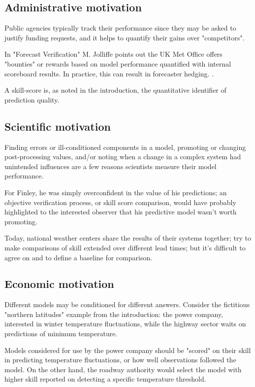 \documentclass[logos,parttoc,morelanguage=french,morelanguage=german,draft]{orsay-memoire}
\begin{document}
\subsection{Administrative motivation}
Public agencies typically track their performance since they may be asked to justify funding requests, and it helps to quantify their gains over "competitors".

In "Forecast Verification" M. Jolliffe points out the UK Met Office offers "bounties" or rewards based on model performance quantified with internal scoreboard results. In practice, this can result in forecaster hedging.
\autocite{JolliffeIanT.andStephenson2012ForecastVerification}. 

A \gls{skill-score} is, as noted in the introduction, the quantitative identifier of prediction quality.

\subsection{Scientific motivation}

Finding errors or ill-conditioned components in a model, promoting or changing post-processing values, and/or noting when a change in a complex system had unintended influences are a few reasons scientists measure their model performance.

For Finley, he was simply overconfident in the value of his predictions; an objective verification process, or skill score comparison, would have probably highlighted to the interested observer that his predictive model wasn't worth promoting. 

Today, national weather centers share the results of their systems together; try to make comparisons of skill extended over different lead times; but it's difficult to agree on and to define a baseline for comparison.

\subsection{Economic motivation}

Different models may be conditioned for different answers. Consider the fictitious "northern latitudes" example from the introduction: the power company, interested in winter temperature fluctuations, while the highway sector waits on predictions of minimum temperature.

Models considered for use by the power company should be "scored" on their skill in predicting temperature fluctuations, or how well observations followed the model. On the other hand, the roadway authority would select the model with higher skill reported on detecting a specific temperature threshold.
\end{document}
